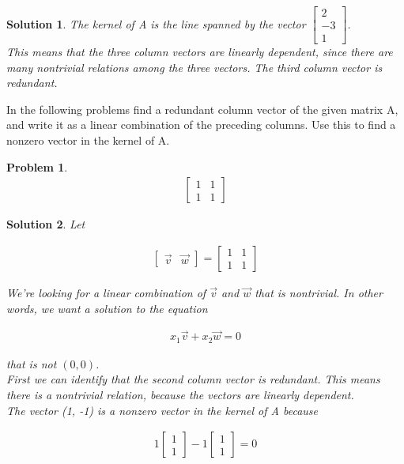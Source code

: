 \documentclass{article}
\newtheorem{problem}{Problem}
\newtheorem*{solution}{Solution}
\begin{document}
\begin{solution}
The kernel of A is the line spanned by the vector $\begin{bmatrix} 2 \\ -3 \\ 1 \end{bmatrix}$. \\

This means that the three column vectors are linearly dependent, since there are many nontrivial relations among the three vectors. The third column vector is redundant.

\end{solution}

In the following problems find a redundant column vector of the given matrix A, and write it as a linear combination of the preceding columns. Use this to find a nonzero vector in the kernel of A.

\begin{problem}
\begin{align*}
\begin{bmatrix}1 & 1 \\ 1 & 1 \end{bmatrix}
\end{align*}
\end{problem}

\begin{solution}
Let

\begin{align*}
\begin{bmatrix}\vec{v} & \vec{w} \end{bmatrix} = \begin{bmatrix}1 & 1 \\ 1 & 1 \end{bmatrix}
\end{align*}

We're looking for a linear combination of $\vec{v}$ and $\vec{w}$ that is nontrivial. In other words, we want a solution to the equation

\begin{align*}
x_{1} \vec{v} + x_{2} \vec{w} = 0
\end{align*}

that is not $(0, 0)$. \\

First we can identify that the second column vector is redundant. This means there is a nontrivial relation, because the vectors are linearly dependent. \\

The vector (1, -1) is a nonzero vector in the kernel of A because 

\begin{align*}
1\begin{bmatrix} 1 \\ 1 \end{bmatrix} - 1\begin{bmatrix} 1 \\ 1\end{bmatrix} = 0
\end{align*}

\end{solution}
\end{document}
